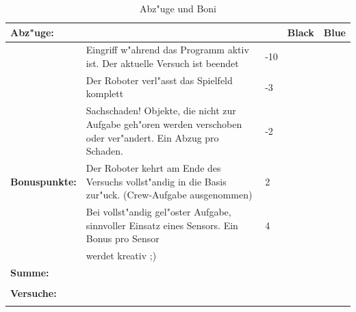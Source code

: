 \documentclass[
    DIV=calc,
    IMRAD=false,
	ngerman,
	accentcolor=1c,%
	marginpar=false,
	]{tudapub}
\begin{document}
\begin{table}[h]
	\begin{tabular}{|p{}|p{}|p{}|p{}|p{}|} \hline
		\textbf{Abz"uge:}& \space &\space&\textbf{Black}&\textbf{Blue} \\ \hline 
		\space& Eingriff w"ahrend das Programm aktiv ist. Der aktuelle Versuch ist beendet &-10&\space&\space \\ \hline
		\space& Der Roboter verl"asst das Spielfeld komplett &-3&\space&\space \\ \hline
		\space& Sachschaden! Objekte, die nicht zur Aufgabe geh"oren werden verschoben oder ver"andert. Ein Abzug pro Schaden. &-2&\space&\space \\ \hline
		\textbf{Bonuspunkte:}& Der Roboter kehrt am Ende des Versuchs vollst"andig in die Basis zur"uck. (Crew-Aufgabe ausgenommen) &2&\space&\space \\ \hline
		\space& Bei vollst"andig gel"oster Aufgabe, sinnvoller Einsatz eines Sensors. Ein Bonus pro Sensor &4&\space&\space \\ \hline
		\space& werdet kreativ ;) & \space &\space&\space \\ \hline
		\textbf{Summe:}& \space &\space&\space&\space \\  
		\space& \space &\space&\space&\space \\  \hline
		\textbf{Versuche:}& \space &\space&\space&\space \\ 
		\space& \space &\space&\space&\space \\  \hline
	\end{tabular}
	\caption{Abz"uge und Boni}
\end{table}

\cfoot{\textcolor{lightgray} \today}
\end{document}
